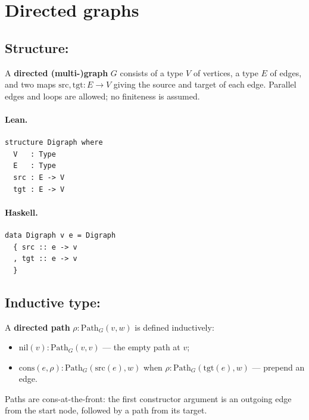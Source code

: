 \documentclass[11pt,a4paper]{article}
\begin{document}
\section{Directed graphs}

\subsection{Structure: }

\begin{defn}
A \textbf{directed (multi-)graph} $G$ consists of a type $V$ of vertices, a
type $E$ of edges, and two maps $\mathrm{src}, \mathrm{tgt} : E \to V$ giving
the source and target of each edge.  Parallel edges and loops are allowed; no
finiteness is assumed.
\end{defn}

\paragraph{Lean.}
\begin{lstlisting}[style=lean]
structure Digraph where
  V   : Type
  E   : Type
  src : E -> V
  tgt : E -> V
\end{lstlisting}

\paragraph{Haskell.}
\begin{lstlisting}[style=haskell]
data Digraph v e = Digraph
  { src :: e -> v
  , tgt :: e -> v
  }
\end{lstlisting}


\subsection{Inductive type: }

\begin{defn}
A \textbf{directed path} $\rho : \mathrm{Path}_G(v, w)$ is defined
inductively:
\begin{itemize}
  \item $\mathrm{nil}(v) : \mathrm{Path}_G(v, v)$ --- the empty path at $v$;
  \item $\mathrm{cons}(e, \rho) : \mathrm{Path}_G(\mathrm{src}(e), w)$ when
    $\rho : \mathrm{Path}_G(\mathrm{tgt}(e), w)$ --- prepend an edge.
\end{itemize}
Paths are cons-at-the-front: the first constructor argument is an outgoing
edge from the start node, followed by a path from its target.
\end{defn}
\end{document}
